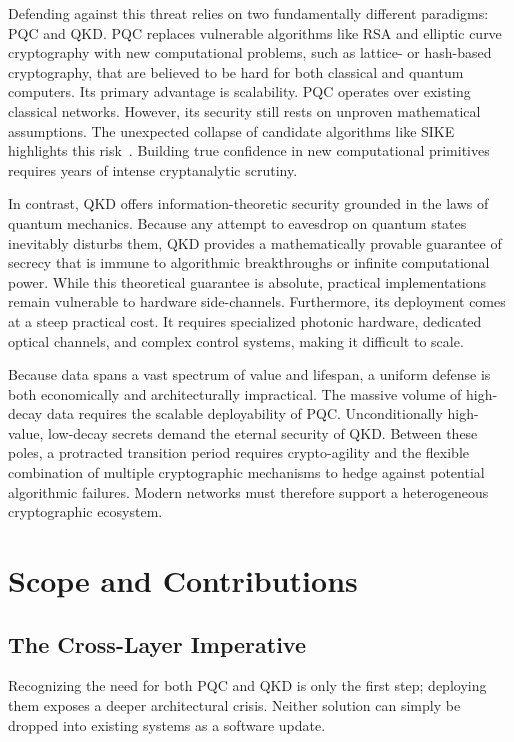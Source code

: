 Defending against this threat relies on two fundamentally different paradigms: PQC and QKD.
PQC replaces vulnerable algorithms like RSA and elliptic curve cryptography with new computational problems, such as lattice- or hash-based cryptography, that are believed to be hard for both classical and quantum computers. Its primary advantage is scalability. PQC operates over existing classical networks. However, its security still rests on unproven mathematical assumptions. The unexpected collapse of candidate algorithms like SIKE highlights this risk~\cite{castryck2023sidh}. Building true confidence in new computational primitives requires years of intense cryptanalytic scrutiny.

In contrast, QKD offers information-theoretic security grounded in the laws of quantum mechanics. Because any attempt to eavesdrop on quantum states inevitably disturbs them, QKD provides a mathematically provable guarantee of secrecy that is immune to algorithmic breakthroughs or infinite computational power. While this theoretical guarantee is absolute, practical implementations remain vulnerable to hardware side-channels. Furthermore, its deployment comes at a steep practical cost. It requires specialized photonic hardware, dedicated optical channels, and complex control systems, making it difficult to scale.

Because data spans a vast spectrum of value and lifespan, a uniform defense is both economically and architecturally impractical. The massive volume of high-decay data requires the scalable deployability of PQC. Unconditionally high-value, low-decay secrets demand the eternal security of QKD. Between these poles, a protracted transition period requires crypto-agility and the flexible combination of multiple cryptographic mechanisms to hedge against potential algorithmic failures. Modern networks must therefore support a heterogeneous cryptographic ecosystem.

\section{Scope and Contributions}

\subsection{The Cross-Layer Imperative}

Recognizing the need for both PQC and QKD is only the first step; deploying them exposes a deeper architectural crisis. Neither solution can simply be dropped into existing systems as a software update.

